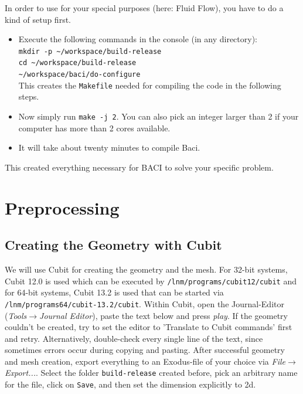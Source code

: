 In order to use \baci{} for your special purposes (here: Fluid Flow), you have
to do a kind of setup first. 
\begin{itemize}
\item Execute the following commands in the console (in any directory):\\
\texttt{mkdir -p \textasciitilde{}/workspace/build-release}\\
\texttt{cd \textasciitilde{}/workspace/build-release}\\
\texttt{\textasciitilde{}/workspace/baci/do-configure}\\

This creates the \texttt{Makefile} needed for compiling the code in the following steps. 
\item Now simply run \texttt{make -j 2}. You can also pick an integer larger than 2 if your computer has more than 2 cores available.
\item It will take about twenty minutes to compile Baci.
\end{itemize}
This created everything necessary for BACI to solve your specific problem.
\section{Preprocessing}

\subsection{Creating the Geometry with Cubit}
We will use Cubit for creating the geometry and the mesh. For 32-bit systems, Cubit 12.0 is used which can be executed by \texttt{/lnm/programs/cubit12/cubit} and for 64-bit systems, Cubit 13.2 is used that can be started via \texttt{/lnm/programs64/cubit-13.2/cubit}. Within Cubit, open the Journal-Editor (\emph{Tools}$\to$\emph{Journal
Editor}), paste the text below and press \emph{play}. If the geometry couldn't be created, try to set the editor to 'Translate to Cubit commands' first and retry. Alternatively, double-check every single line of the text, since sometimes errors occur during copying and pasting. After successful geometry and mesh creation, export everything to an Exodus-file of your choice via \emph{File}$\to$\emph{Export...}. Select the folder \texttt{build-release} created before, pick an arbitrary name for the file, click on \texttt{Save}, and then set the dimension explicitly to 2d.

